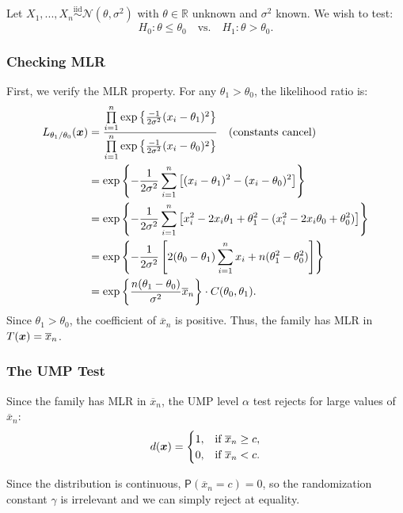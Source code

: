 \begin{ex}
    
\label{ex:gaussian_mean_ump}

Let $X_1, ..., X_n \stackrel{\text{iid}}{\sim} \mathcal{N}(\theta, \sigma^2)$ with $\theta \in \mathbb{R}$ unknown and $\sigma^2$ known.
We wish to test:
\[ H_0: \theta \le \theta_0 \quad \text{vs.} \quad H_1: \theta > \theta_0. \]

\subsubsection{Checking MLR}
First, we verify the MLR property. For any $\theta_1 > \theta_0$, the likelihood ratio is:
\[
\begin{split} 
L_{\theta_1/\theta_0}(\boldsymbol{x}) &= \frac{\prod\limits_{i=1}^n \exp\left\{\frac{-1}{2\sigma^2} (x_i - \theta_1)^2\right\}}{\prod\limits_{i=1}^n \exp\left\{\frac{-1}{2\sigma^2} (x_i - \theta_0)^2\right\}} \quad (\text{constants cancel}) \\ 
&= \exp\left\{-\frac{1}{2\sigma^2} \sum_{i=1}^n \left[(x_i - \theta_1)^2 - (x_i - \theta_0)^2\right]\right\} \\
&= \exp\left\{-\frac{1}{2\sigma^2} \sum_{i=1}^n \left[ x_i^2 - 2x_i\theta_1 + \theta_1^2 - (x_i^2 - 2x_i\theta_0 + \theta_0^2) \right] \right\} \\
&= \exp\left\{-\frac{1}{2\sigma^2} \left[ 2(\theta_0 - \theta_1)\sum\limits_{i=1}^{n}  x_i + n(\theta_1^2 - \theta_0^2) \right] \right\} \\
&= \exp\left\{ \frac{n(\theta_1 - \theta_0)}{\sigma^2} \overline{x}_n \right\} \cdot C(\theta_0, \theta_1).
\end{split}
\]
Since $\theta_1 > \theta_0$, the coefficient of $\overline{x}_n$ is positive. Thus, the family has MLR in $T(\boldsymbol{x}) = \overline{x}_n$.

\subsubsection{The UMP Test}
Since the family has MLR in $\overline{x}_n$, the UMP level $\alpha$ test rejects for large values of $\overline{x}_n$:
\[
d(\boldsymbol{x}) = \begin{cases} 
1, & \text{if } \overline{x}_n \ge c, \\ 
0, & \text{if } \overline{x}_n < c. 
\end{cases}
\]
\begin{remark}[]
 Since the distribution is continuous, $\mathsf{P}(\overline{x}_n = c) = 0$, so the randomization constant $\gamma$ is irrelevant and we can simply reject at equality.
\end{remark}


\end{ex}
